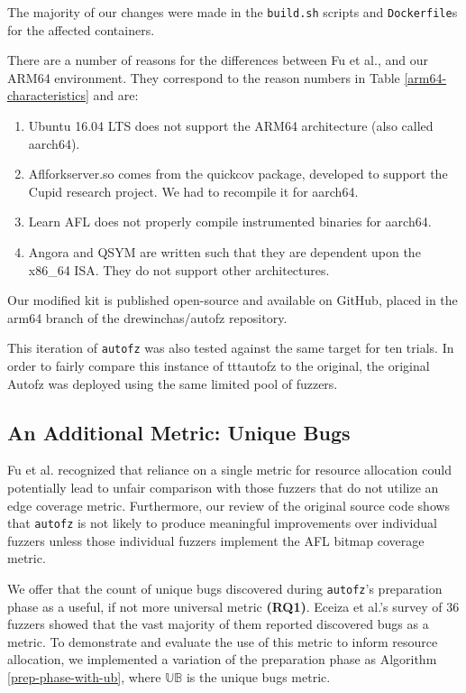 The majority of our changes were made in the \texttt{build.sh} scripts and \texttt{Dockerfile}s
for the affected containers.

There are a number of reasons for the differences between Fu et al.,
and our ARM64 environment. They correspond to the reason numbers in Table 
\ref{arm64-characteristics} and are:

\begin{enumerate}
    \item Ubuntu 16.04 LTS does not support the ARM64 architecture (also called 
    aarch64).
    \item Aflforkserver.so comes from the quickcov package, developed to support 
    the Cupid research project\cite{guler_cupid_2020}. We had to recompile it for aarch64.
    \item Learn AFL does not properly compile instrumented binaries for aarch64.
    \item Angora and QSYM are written such that they are dependent upon the x86\_64 ISA.
    They do not support other architectures.
\end{enumerate}

Our modified kit is published open-source and available on GitHub, 
\cite{noauthor_drewinchasautofz_nodate} placed in the arm64 branch 
of the drewinchas/autofz repository.

This iteration of \texttt{autofz} was also tested against the same target for ten trials.
In order to fairly compare this instance of ttt{autofz} to the original, the 
original Autofz was deployed using the same limited pool of fuzzers. 

\subsection{An Additional Metric: Unique Bugs}

Fu et al.\cite{fu_autofz_2023} recognized that reliance on a single metric for resource 
allocation could potentially lead to unfair comparison with those fuzzers that do not 
utilize an edge coverage metric. Furthermore, our review of the original source 
code shows that \texttt{autofz} is not likely to produce meaningful improvements over individual 
fuzzers unless those individual fuzzers implement the AFL bitmap coverage metric.

We offer that the count of unique bugs discovered during \texttt{autofz}'s preparation phase 
as a useful, if not more universal metric \textbf{(RQ1)}. Eceiza et al.\cite{eceiza_improving_2023}'s 
survey of 36 fuzzers showed that the vast majority of them reported discovered 
bugs as a metric. To demonstrate and evaluate the use of this metric to inform resource allocation, we 
implemented a variation of the preparation phase as Algorithm \ref{prep-phase-with-ub}, 
where $\mathbb{UB}$ is the unique bugs metric.

